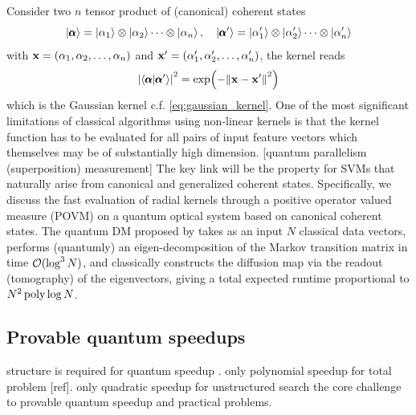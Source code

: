 Consider two $n$ tensor product of (canonical) coherent states
\begin{equation}
	\ket{\pmb{\alpha}} = \ket{\alpha_{1}} \otimes\ket{\alpha_{2}} \cdots\otimes\ket{\alpha_{n}} 
	,\quad
	\ket{\pmb{\alpha}'} = \ket{\alpha_{1}'} \otimes\ket{\alpha_{2}'} \cdots\otimes\ket{\alpha_{n}'} 
\end{equation}
with $\vb{x}=(\alpha_1,\alpha_2,\dots,\alpha_n)$ and $\vb{x}'=(\alpha_1',\alpha_2',\dots,\alpha_n')$, the kernel reads
\begin{equation}
	\abs{\braket{\pmb{\alpha}}{\pmb{\alpha}'}}^2 = 
	\exp(-\norm{\vb{x}-\vb{x}'}^2) 
\end{equation}
which is the Gaussian kernel c.f. \cref{eq:gaussian_kernel}.
One of the most significant limitations of classical algorithms using non-linear kernels is that the kernel function has to be evaluated for all pairs of input feature vectors which themselves may be of substantially high dimension. [quantum parallelism (superposition) measurement]
The key link will be the  property for SVMs that naturally arise from canonical and generalized coherent states. 
Specifically, we discuss the fast evaluation of radial kernels through a positive operator valued measure (POVM) on a quantum optical system based on canonical coherent states.
\cite{chatterjeeGeneralizedCoherentStates2017}
The quantum DM proposed by \cite{sornsaengQuantumDiffusionMap2021} takes as an input $N$ classical data vectors, 
performs (quantumly) an eigen-decomposition of the Markov transition matrix in time $\mathcal{O}(\log^3 N)$, 
and classically constructs the diffusion map via the readout (tomography) of the eigenvectors, giving a total expected runtime proportional to $N^2 \operatorname{\textup{poly}}\log N$.


\subsection{Provable quantum speedups}
structure is required for quantum speedup
\cite{aaronsonNeedStructureQuantum2014}.
only polynomial speedup for total problem [ref].
only quadratic speedup for unstructured search \cite{groverQuantumMechanicsHelps1997}
the core challenge to provable quantum speedup and practical problems.


